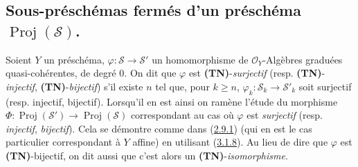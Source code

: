 \subsection{Sous-préschémas fermés d'un préschéma
$\operatorname{Proj}(\mathcal{S})$.}
\label{subsection:II.3.6-fr}

\begin{env}[3.6.1]
\label{II.3.6.1-fr}
Soient $Y$ un préschéma,
$\varphi:\mathcal{S}\to\mathcal{S}'$ un homomorphisme de
$\mathcal{O}_Y$-Algèbres graduées quasi-cohérentes, de degré $0$. On dit que
$\varphi$ est \textbf{(TN)}-\emph{surjectif} (resp.
\textbf{(TN)}-\emph{injectif}, \textbf{(TN)}-\emph{bijectif}) s'il existe $n$
tel que, pour $k\geq n$, $\varphi_k:\mathcal{S}_k\to\mathcal{S}'_k$ soit
surjectif (resp. injectif, bijectif). Lorsqu'il en est ainsi on ramène l'étude
du morphisme
$\Phi:\operatorname{Proj}(\mathcal{S}')\to\operatorname{Proj}(\mathcal{S})$
correspondant au cas où $\varphi$ est \emph{surjectif} (resp. \emph{injectif}, \emph{bijectif}).
Cela se démontre comme dans (\hyperref[II.2.9.1-fr]{2.9.1}) (qui en est le cas
particulier correspondant à $Y$ affine) en utilisant
(\hyperref[II.3.1.8-fr]{3.1.8}). Au lieu de dire que $\varphi$ est
\textbf{(TN)}-bijectif, on dit aussi que c'est alors un
\textbf{(TN)}-\emph{isomorphisme}.
\end{env}

